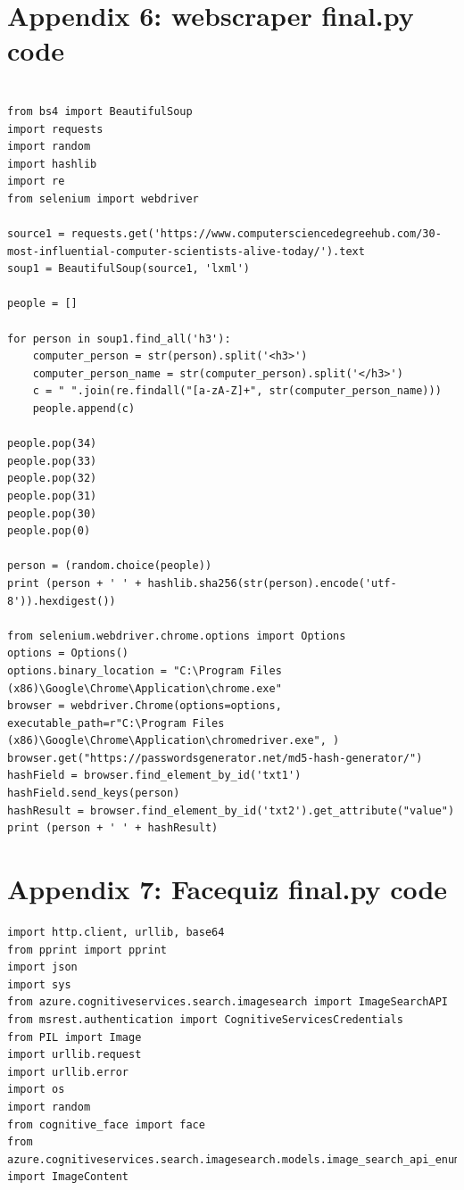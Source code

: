 \documentclass[12pt,a4paper]{article}
\begin{document}
\begin{appendices}
\section{Appendix 6: web\textunderscore scraper \textunderscore final.py code}  
\begin{lstlisting}
    
from bs4 import BeautifulSoup 
import requests   
import random 
import hashlib 
import re 
from selenium import webdriver

source1 = requests.get('https://www.computersciencedegreehub.com/30-most-influential-computer-scientists-alive-today/').text
soup1 = BeautifulSoup(source1, 'lxml')  
 
people = [] 

for person in soup1.find_all('h3'):  
    computer_person = str(person).split('<h3>')  
    computer_person_name = str(computer_person).split('</h3>') 
    c = " ".join(re.findall("[a-zA-Z]+", str(computer_person_name)))   
    people.append(c) 
    
people.pop(34)
people.pop(33) 
people.pop(32) 
people.pop(31) 
people.pop(30) 
people.pop(0) 

person = (random.choice(people)) 
print (person + ' ' + hashlib.sha256(str(person).encode('utf-8')).hexdigest())
    
from selenium.webdriver.chrome.options import Options
options = Options()
options.binary_location = "C:\Program Files (x86)\Google\Chrome\Application\chrome.exe"
browser = webdriver.Chrome(options=options, executable_path=r"C:\Program Files (x86)\Google\Chrome\Application\chromedriver.exe", )
browser.get("https://passwordsgenerator.net/md5-hash-generator/") 
hashField = browser.find_element_by_id('txt1') 
hashField.send_keys(person)  
hashResult = browser.find_element_by_id('txt2').get_attribute("value")    
print (person + ' ' + hashResult)
\end{lstlisting}
\section{Appendix 7: Face\textunderscore quiz \textunderscore final.py code}  
\begin{lstlisting}
import http.client, urllib, base64
from pprint import pprint 
import json
import sys 
from azure.cognitiveservices.search.imagesearch import ImageSearchAPI
from msrest.authentication import CognitiveServicesCredentials  
from PIL import Image 
import urllib.request  
import urllib.error
import os  
import random
from cognitive_face import face
from azure.cognitiveservices.search.imagesearch.models.image_search_api_enums import ImageContent




\end{lstlisting}
\end{appendices}
\end{document}
